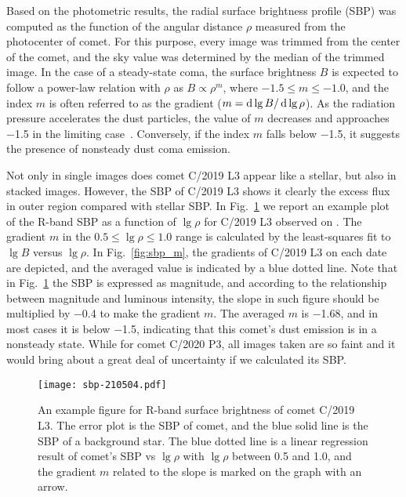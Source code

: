 Based on the photometric results, the radial surface brightness profile (SBP) was computed as the function of the angular distance $\rho$ measured from the photocenter of comet. For this purpose, every image was trimmed from the center of the comet, and the sky value was determined by the median of the trimmed image. 
In the case of a steady-state coma, the surface brightness $B$ is expected to follow a power-law relation with $\rho$ as $B \propto \rho^m$, where $-1.5 \leqslant m \leqslant -1.0$, and the index $m$ is often referred to as the gradient ($m=\mathop{}\!\mathrm{d}\lg{B} / \mathop{}\!\mathrm{d}\lg{\rho}$). As the radiation pressure accelerates the dust particles, the value of $m$ decreases and approaches \si{\num{-1.5}} in the limiting case~\citep{jewitt_surface_1987}. Conversely, if the index $m$ falls below \si{\num{-1.5}}, it suggests the presence of nonsteady dust coma emission.

Not only in single images does comet C/2019 L3 appear like a stellar, but also in stacked images. However, the SBP of C/2019 L3 shows it clearly the excess flux in outer region compared with stellar SBP. In Fig.~\ref{fig:sbp} we report an example plot of the R-band SBP as a function of $\lg{\rho}$ for C/2019 L3 observed on . The gradient $m$ in the $0.5 \leqslant \lg{\rho} \leqslant 1.0$ range is calculated by the least-squares fit to $\lg{B}$ versus $\lg{\rho}$. 
In Fig.~\ref{fig:sbp_m}, the gradients of C/2019 L3 on each date are depicted, and the averaged value is indicated by a blue dotted line. 
Note that in Fig.~\ref{fig:sbp} the SBP is expressed as magnitude, and according to the relationship between magnitude and luminous intensity, the slope in such figure should be multiplied by \num{-0.4} to make the gradient $m$. The averaged $m$ is \si{\num{-1.68}}, and in most cases it is below \si{\num{-1.5}}, indicating that this comet's dust emission is in a nonsteady state. While for comet C/2020 P3, all images taken are so faint and it would bring about a great deal of uncertainty if we calculated its SBP. 

\begin{figure}
    \centering
    \texttt{[image: sbp-210504.pdf]}
    \caption{An example figure for R-band surface brightness of comet C/2019 L3. The error plot is the SBP of comet, and the blue solid line is the SBP of a background star. The blue dotted line is a linear regression result of comet's SBP vs $\lg{\rho}$ with $\lg{\rho}$ between 0.5 and 1.0, and the gradient $m$ related to the slope is marked on the graph with an arrow. }
    \label{fig:sbp}
\end{figure}


